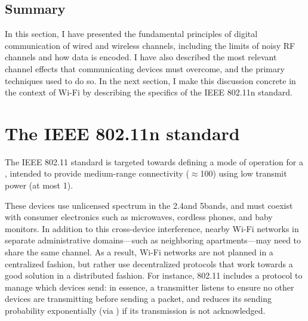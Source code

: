 


\subsection{Summary}
\label{sec:background_80211n}
In this section, I have presented the fundamental principles of digital communication of wired and wireless channels, including the limits of noisy RF channels and how data is encoded. I have also described the most relevant channel effects that communicating devices must overcome, and the primary techniques used to do so. In the next section, I make this discussion concrete in the context of Wi-Fi by describing the specifics of the IEEE 802.11n standard. 

\section{The IEEE 802.11n standard}
The IEEE 802.11 standard is targeted towards defining a mode of operation for a , intended to provide medium-range connectivity ($\approx$100\m) using low transmit power (at most 1\W).

These devices use unlicensed spectrum in the 2.4\GHz and 5\GHz bands, and must coexist with consumer electronics such as microwaves, cordless phones, and baby monitors. In addition to this cross-device interference, nearby Wi-Fi networks in separate administrative domains---such as neighboring apartments---may need to share the same channel. As a result, Wi-Fi networks are not planned in a centralized fashion, but rather use decentralized protocols that work towards a good solution in a distributed fashion. For instance, 802.11 includes a  protocol to manage which devices send: in essence, a transmitter listens to ensure no other devices are transmitting before sending a packet, and reduces its sending probability exponentially (via ) if its transmission is not acknowledged.

